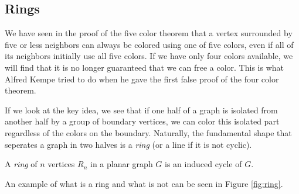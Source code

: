 \subsection{Rings}
\label{subsec:rings}

We have seen in the proof of the five color theorem that a vertex surrounded by five or less neighbors can always be colored using one of five colors, even if all of its neighbors initially use all five colors. If we have only four colors available, we will find that it is no longer guaranteed that we can free a color. This is what Alfred Kempe tried to do when he gave the first false proof of the four color theorem.

If we look at the key idea, we see that if one half of a graph is isolated from another half by a group of boundary vertices, we can color this isolated part regardless of the colors on the boundary. Naturally, the fundamental shape that seperates a graph in two halves is a \textit{ring} (or a line if it is not cyclic).

\begin{definition}
    A \emph{ring} of $n$ vertices $R_n$ in a planar graph $G$ is an induced cycle of $G$.
\end{definition}

An example of what is a ring and what is not can be seen in Figure \ref{fig:ring}.

